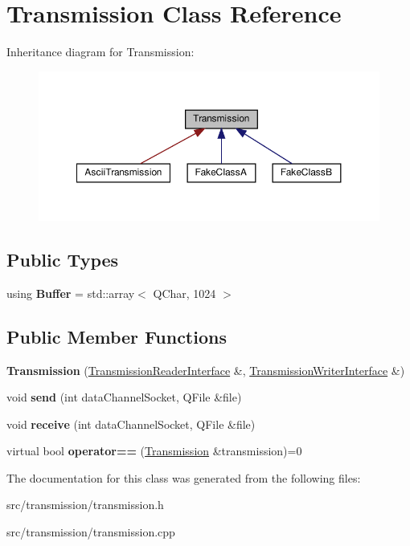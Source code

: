 \hypertarget{classTransmission}{}\section{Transmission Class Reference}
\label{classTransmission}


Inheritance diagram for Transmission\+:
\nopagebreak
\begin{figure}[H]
\begin{center}
\leavevmode
\includegraphics[width=350pt]{classTransmission__inherit__graph}
\end{center}
\end{figure}
\subsection*{Public Types}
\begin{DoxyCompactItemize}
\item 
\mbox{\label{classTransmission_acd42be23ed21b738fa06f867222a7f8d}} 
using {\bfseries Buffer} = std\+::array$<$ Q\+Char, 1024 $>$
\end{DoxyCompactItemize}
\subsection*{Public Member Functions}
\begin{DoxyCompactItemize}
\item 
\mbox{\label{classTransmission_a8415d3268935ba7454d8587417458c8f}} 
{\bfseries Transmission} (\hyperlink{structTransmissionReaderInterface}{Transmission\+Reader\+Interface} \&, \hyperlink{structTransmissionWriterInterface}{Transmission\+Writer\+Interface} \&)
\item 
\mbox{\label{classTransmission_adf3870436266de959b4d7024329ac2ad}} 
void {\bfseries send} (int data\+Channel\+Socket, Q\+File \&file)
\item 
\mbox{\label{classTransmission_ad138c5347e49e5c4ccbce8d20446dcac}} 
void {\bfseries receive} (int data\+Channel\+Socket, Q\+File \&file)
\item 
\mbox{\label{classTransmission_a58501d7643fabee07f82009aa7adcb15}} 
virtual bool {\bfseries operator==} (\hyperlink{classTransmission}{Transmission} \&transmission)=0
\end{DoxyCompactItemize}


The documentation for this class was generated from the following files\+:\begin{DoxyCompactItemize}
\item 
src/transmission/transmission.\+h\item 
src/transmission/transmission.\+cpp\end{DoxyCompactItemize}
